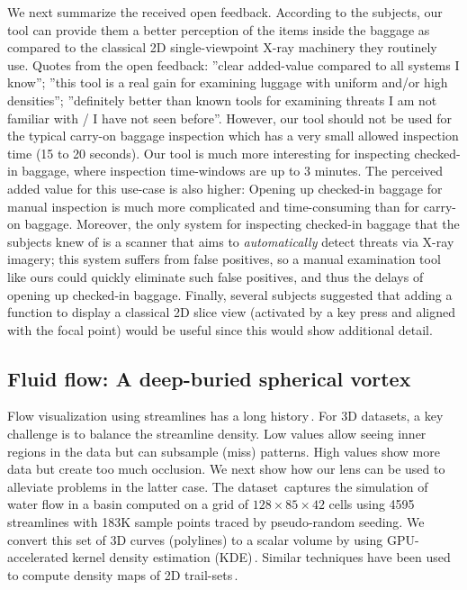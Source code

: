 We next summarize the received open feedback. According to the subjects, our tool can provide them a better perception of the items inside the baggage as compared to the classical 2D single-viewpoint X-ray machinery they routinely use. Quotes from the open feedback: ''clear added-value compared to all systems I know''; ''this tool is a real gain for examining luggage with uniform and/or high densities''; ''definitely better than known tools for examining threats I am not familiar with / I have not seen before''. However, our tool should not be used for the typical carry-on baggage inspection which has a very small allowed inspection time (15 to 20 seconds). Our tool is much more interesting for inspecting checked-in baggage, where inspection time-windows are up to 3 minutes. The perceived added value for this use-case is also higher: Opening up checked-in baggage for manual inspection is much more complicated and time-consuming than for carry-on baggage. Moreover, the only system for inspecting checked-in baggage that the subjects knew of is a scanner that aims to \emph{automatically} detect threats via X-ray imagery; this system suffers from false positives, so a manual examination tool like ours could quickly eliminate such false positives, and thus the delays of opening up checked-in baggage. Finally, several subjects suggested that adding a function to display a classical 2D slice view (activated by a key press and aligned with the focal point) would be useful since this would show additional detail.


\subsection{Fluid flow: A deep-buried spherical vortex}
\label{sec:flow}
%
%
Flow visualization using streamlines has a long history\,\cite{brambilla2012illustrative,merzkirch2012flow}. For 3D datasets, a key challenge is to balance the streamline density. Low values allow seeing inner regions in the data but can subsample (miss) patterns. High values show more data but create too much occlusion. We next show how our lens can be used to alleviate problems in the latter case. The dataset\,\cite{griebel2004flow} captures the simulation of water flow in a basin computed on a grid of $128 \times 85 \times 42$ cells using 4595 streamlines with 183K sample points traced by pseudo-random seeding. We convert this set of 3D curves (polylines) to a scalar volume by using GPU-accelerated kernel density estimation (KDE)\,\cite{lhuillier2017ffteb}. Similar techniques have been used to compute density maps of 2D trail-sets\,\cite{hurter2012graph,cubu,hurter2015image}. 

